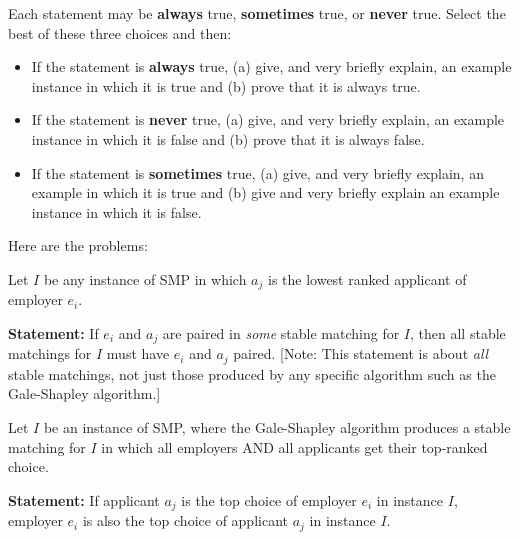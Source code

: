 \documentclass[11pt,fleqn]{exam}
\newif\ifsolutions\solutionsfalse
\begin{document}
Each statement may be \textbf{always} true, \textbf{sometimes} true, or \textbf{never} true. Select the best of these three choices and then:
	\begin{itemize}
		\item If the statement is \textbf{always} true, (a) give, and very briefly explain, an example instance in which it is true and (b) prove that it is always true.
		\item If the statement is \textbf{never} true, (a) give, and very briefly explain, an example instance in which it is false and (b) prove that it is always false.
		\item If the statement is \textbf{sometimes} true, (a) give, and very briefly explain, an example in which it is true and (b) give and very briefly explain an example instance in which it is false.
	\end{itemize}
	Here are the problems:

\begin{questions}
\question[2]
  Let $I$ be any instance of SMP in which $a_j$ is the lowest ranked applicant of employer $e_i$. 

\noindent
    {\bf Statement:} If $e_i$ and $a_j$ are paired in {\em some} stable matching for $I$, then all stable matchings for $I$ must have $e_i$ and $a_j$ paired. [Note: This statement is about {\em all} stable matchings, not just those produced by any specific algorithm such as the Gale-Shapley algorithm.]

    \ifsolutions
    
    \else
    \fi
    
\question[2]
Let $I$ be an instance of SMP, where the Gale-Shapley algorithm produces a stable matching for $I$ in which all employers AND all applicants get their top-ranked choice. 

\noindent
{\bf Statement:}  
If applicant $a_j$ is the top choice of employer $e_i$ in instance $I$, employer $e_i$ is also the top choice of applicant $a_j$ in instance $I$.

\ifsolutions

\else
\fi
\end{questions}

\clearpage
    
\end{document}
